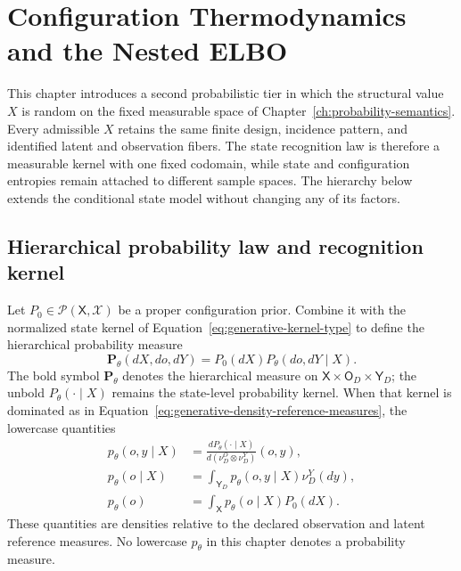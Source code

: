 \chapter{Configuration Thermodynamics and the Nested ELBO}
\label{ch:configuration-elbo}

This chapter introduces a second probabilistic tier in which the structural value \(X\) is random on the fixed measurable space of Chapter~\ref{ch:probability-semantics}. Every admissible \(X\) retains the same finite design, incidence pattern, and identified latent and observation fibers. The state recognition law is therefore a measurable kernel with one fixed codomain, while state and configuration entropies remain attached to different sample spaces. The hierarchy below extends the conditional state model without changing any of its factors.

\section{Hierarchical probability law and recognition kernel}

Let \(P_0\in\mathcal P(\mathsf X,\mathscr X)\) be a proper configuration prior. Combine it with the normalized state kernel of Equation~\eqref{eq:generative-kernel-type} to define the hierarchical probability measure
\begin{equation}
\mathbf P_\theta(dX,do,dY)
=P_0(dX)P_\theta(do,dY\mid X).
\label{eq:hierarchical-generative-measure}
\end{equation}
The bold symbol \(\mathbf P_\theta\) denotes the hierarchical measure on
\(\mathsf X\times\mathsf O_D\times\mathsf Y_D\); the unbold \(P_\theta(\mathord\cdot\mid X)\) remains the state-level probability kernel. When that kernel is dominated as in Equation~\eqref{eq:generative-density-reference-measures}, the lowercase quantities
\begin{align}
p_\theta(o,y\mid X)
&=\frac{dP_\theta(\mathord\cdot\mid X)}
{d(\nu_D^O\otimes\nu_D^Y)}(o,y),
\label{eq:hierarchical-conditional-density}\\
p_\theta(o\mid X)
&=\int_{\mathsf Y_D}p_\theta(o,y\mid X)\nu_D^Y(dy),
\label{eq:hierarchical-conditional-evidence-density}\\
p_\theta(o)
&=\int_{\mathsf X}p_\theta(o\mid X)P_0(dX).
\label{eq:hierarchical-evidence-density}
\end{align}
These quantities are densities relative to the declared observation and latent reference measures. No lowercase \(p_\theta\) in this chapter denotes a probability measure.

